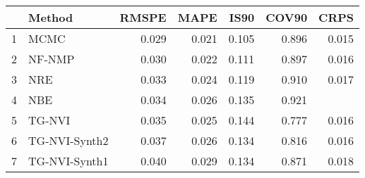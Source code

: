 \documentclass[12pt]{article}
\begin{document}
\thispagestyle{empty}
\begin{table}[ht]
\centering
\begin{tabular}{rlrrrrr}
  \hline
 & Method & RMSPE & MAPE & IS90 & COV90 & CRPS \\ 
  \hline
1 & MCMC & 0.029 & 0.021 & 0.105 & 0.896 & 0.015 \\ 
  2 & NF-NMP & 0.030 & 0.022 & 0.111 & 0.897 & 0.016 \\ 
  3 & NRE & 0.033 & 0.024 & 0.119 & 0.910 & 0.017 \\ 
  4 & NBE & 0.034 & 0.026 & 0.135 & 0.921 &  \\ 
  5 & TG-NVI & 0.035 & 0.025 & 0.144 & 0.777 & 0.016 \\ 
  6 & TG-NVI-Synth2 & 0.037 & 0.026 & 0.134 & 0.816 & 0.016 \\ 
  7 & TG-NVI-Synth1 & 0.040 & 0.029 & 0.134 & 0.871 & 0.018 \\ 
   \hline
\end{tabular}
\end{table}
\end{document}
